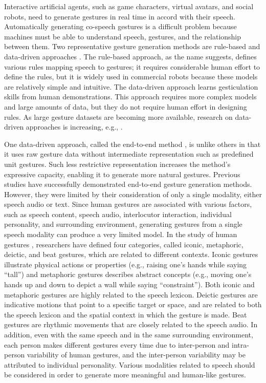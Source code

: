 \documentclass[acmtog]{acmart}
\begin{document}
Interactive artificial agents, such as game characters, virtual avatars, and social robots, need to generate gestures in real time in accord with their speech. Automatically generating co-speech gestures is a difficult problem because machines must be able to understand speech, gestures, and the relationship between them. Two representative gesture generation methods are rule-based and data-driven approaches \cite{kopp2006towards, kipp2005gesture}. The rule-based approach, as the name suggests, defines various rules mapping speech to gestures; it requires considerable human effort to define the rules, but it is widely used in commercial robots because these models are relatively simple and intuitive. The data-driven approach learns gesticulation skills from human demonstrations. This approach requires more complex models and large amounts of data, but they do not require human effort in designing rules. As large gesture datasets are becoming more available, research on data-driven approaches is increasing, e.g., \cite{kipp2005gesture, huang2014learning, chiu2015predicting, ginosar2019gestures, yoon2019robots}.

One data-driven approach, called the end-to-end method \cite{ginosar2019gestures, yoon2019robots}, is unlike others in that it uses raw gesture data without intermediate representation such as predefined unit gestures. Such less restrictive representation increases the method’s expressive capacity, enabling it to generate more natural gestures. Previous studies have successfully demonstrated end-to-end gesture generation methods. However, they were limited by their consideration of only a single modality, either speech audio or text. Since human gestures are associated with various factors, such as speech content, speech audio, interlocutor interaction, individual personality, and surrounding environment, generating gestures from a single speech modality can produce a very limited model. In the study of human gestures \cite{mcneill1992hand}, researchers have defined four categories, called iconic, metaphoric, deictic, and beat gestures, which are related to different contexts. Iconic gestures illustrate physical actions or properties (e.g., raising one’s hands while saying ``tall'') and metaphoric gestures describes abstract concepts (e.g., moving one’s hands up and down to depict a wall while saying ``constraint''). Both iconic and metaphoric gestures are highly related to the speech lexicon. Deictic gestures are indicative motions that point to a specific target or space, and are related to both the speech lexicon and the spatial context in which the gesture is made. Beat gestures are rhythmic movements that are closely related to the speech audio. In addition, even with the same speech and in the same surrounding environment, each person makes different gestures every time due to inter-person and intra-person variability of human gestures, and the inter-person variability may be attributed to individual personality. Various modalities related to speech should be considered in order to generate more meaningful and human-like gestures. 
\end{document}
